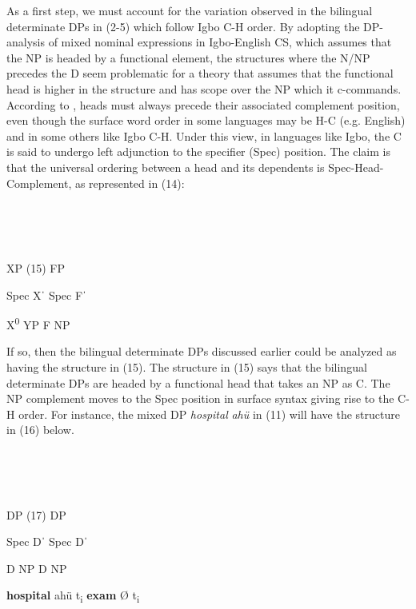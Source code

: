 \documentclass[output=paper]{langsci/langscibook}
\begin{document}
As a first step, we must account for the variation observed in the bilingual determinate DPs in (2-5) which follow Igbo C-H order. By adopting the DP-analysis of mixed nominal expressions in Igbo-English CS, which assumes that the NP is headed by a functional element, the structures where the N/NP precedes the D seem problematic for a theory that assumes that the functional head is higher in the structure and has scope over the NP which it c-commands. According to \citet{Kayne1994}, heads must always precede their associated complement position, even though the surface word order in some languages may be H-C (e.g. English) and in some others like Igbo C-H. Under this view, in languages like Igbo, the C is said to undergo left adjunction to the specifier (Spec) position. The claim is that the universal ordering between a head and its dependents is Spec-Head-Complement, as represented in (14):

\ea%
    \label{ex:14}
    \\
    \gll\\
	\\
    \glt
    \z

	      XP      (15)    FP

Spec    Xˈ      Spec    Fˈ

      X\textsuperscript{0    }YP      F    NP        

If so, then the bilingual determinate DPs discussed earlier could be analyzed as having the structure in (15). The structure in (15) says that the bilingual determinate DPs are headed by a functional head that takes an NP as C. The NP complement moves to the Spec position in surface syntax giving rise to the C-H order. For instance, the mixed DP \textit{hospital}\textbf{\textit{ }}\textit{ahü} in (11) will have the structure in (16) below.

\ea%
    \label{ex:16}
    \\
    \gll\\
	\\
    \glt
    \z

	    DP        (17)    DP

  Spec       Dˈ      Spec      Dˈ

      D    NP        D    NP

         \textbf{hospital}            ahü     t\textsubscript{i    }\textbf{exam    }Ø    t\textsubscript{i}
\end{document}
